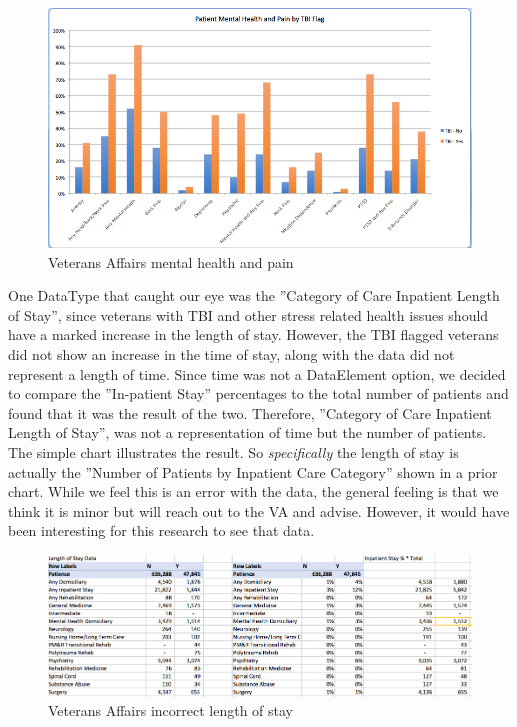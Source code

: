 \documentclass[sigconf]{acmart}
\begin{document}
\begin{figure}[h]
\includegraphics[width=\columnwidth]{images/graph6.png}
\caption{Veterans Affairs mental health and pain}\label{f:Veterans Affairs mental health and pain}
\end{figure}

One DataType that caught our eye was the ''Category of Care Inpatient Length of Stay'', since veterans with TBI and other stress related health issues should have a marked increase in the length of stay.  However, the TBI flagged veterans did not show an increase in the time of stay, along with the data did not represent a length of time.  Since time was not a DataElement option, we decided to compare the ''In-patient Stay'' percentages to the total number of patients and found that it was the result of the two.  Therefore, ''Category of Care Inpatient Length of Stay'', was not a representation of time but the number of patients.  The simple chart illustrates the result.  So {\em specifically} the length of stay is actually the ''Number of Patients by Inpatient Care Category'' shown in a prior chart. While we feel this is an error with the data, the general feeling is that we think it is minor but will reach out to the VA and advise.  However, it would have been interesting for this research to see that data.


\begin{figure}[h]
\includegraphics[width=\columnwidth]{images/graph7.png}
\caption{Veterans Affairs incorrect length of stay}\label{f:Veterans Affairs incorrect length of stay}
\end{figure}
\end{document}
